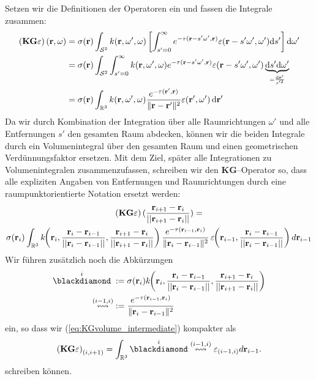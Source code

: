	Setzen wir die Definitionen der Operatoren ein und fassen die Integrale zusammen:
	\begin{align*}
		\left(\mathbf{KG}\varepsilon\right)(\mathbf{r},\omega)&=\sigma(\mathbf{r}) \int_{\mathcal{S}^2} k(\mathbf{r},\omega',\omega)\left[\int_{s'=0}^\infty e^{-\tau(\mathbf{r}-s' \omega',\mathbf{r})}\varepsilon(\mathbf{r}-s' \omega',\omega') \text{d}s'\right] \text{d}\omega' \\
		&=\sigma(\mathbf{r}) \int_{\mathcal{S}^2} \int_{s'=0}^\infty k(\mathbf{r},\omega',\omega) e^{-\tau(\mathbf{r}-s' \omega',\mathbf{r})}\varepsilon(\mathbf{r}-s' \omega',\omega') \underbrace{\text{d}s' \text{d}\omega'}_{=\frac{\text{d}\mathbf{r}'}{s'^2}} \\
		&=\sigma(\mathbf{r}) \int_{\mathbb{R}^3} k(\mathbf{r},\omega',\omega) \frac{e^{-\tau(\mathbf{r}',\mathbf{r})}}{\|\mathbf{r}-\mathbf{r}'\|^2}\varepsilon(\mathbf{r}',\omega') \,\text{d}\mathbf{r}'
	\end{align*}
	Da wir durch Kombination der Integration über alle Raumrichtungen $\omega'$ und alle Entfernungen $s'$ den gesamten Raum abdecken, können wir die beiden Integrale durch ein Volumenintegral über den gesamten Raum und einen geometrischen Verdünnungsfaktor ersetzen. Mit dem Ziel, später alle Integrationen zu Volumenintegralen zusammenzufassen, schreiben wir den $\mathbf{KG}$--Operator so, dass alle expliziten Angaben von Entfernungen und Raumrichtungen durch eine raumpunktorientierte Notation ersetzt werden:
	\begin{multline}
		\left(\mathbf{KG}\varepsilon\right)(\frac{\mathbf{r}_{i+1}-\mathbf{r}_i}{||\mathbf{r}_{i+1}-\mathbf{r}_i||})=\\
		\sigma(\mathbf{r}_i) \int_{\mathbb{R}^3} k\hspace{-1 mm}\left(\mathbf{r}_i,\frac{\mathbf{r}_i-\mathbf{r}_{i-1}}{||\mathbf{r}_i-\mathbf{r}_{i-1}||},\frac{\mathbf{r}_{i+1}-\mathbf{r}_i}{||\mathbf{r}_{i+1}-\mathbf{r}_i||}\right)\frac{e^{-\tau(\mathbf{r}_{i-1},\mathbf{r}_i)}}{\|\mathbf{r}_i-\mathbf{r}_{i-1}\|^2}\,\varepsilon\hspace{-1 mm}\left(\mathbf{r}_{i-1},\frac{\mathbf{r}_i-\mathbf{r}_{i-1}}{||\mathbf{r}_i-\mathbf{r}_{i-1}||}\right)d\mathbf{r}_{i-1}
		\label{eq:KGvolume_intermediate}
	\end{multline}
	Wir führen zusätzlich noch die Abkürzungen
	\begin{align*}
		\scatter{i}\;&:=\sigma(\location{r}_i)k\hspace{-1 mm}\left(\location{r}_i,\normalized{\location{r}_i-\location{r}_{i-1}},\normalized{\location{r}_{i+1}-\location{r}_i}\right)\\
		\propagate{i-1}{i}&:=\frac{e^{-\tau(\location{r}_{i-1},\location{r}_i)}}{\|\location{r}_i-\location{r}_{i-1}\|^2}
	\end{align*}
	ein, so dass wir (\ref{eq:KGvolume_intermediate}) %
	kompakter als
	\begin{equation}
		\left(\mathbf{KG}\varepsilon\right)_{(i,i+1)}=\int_{\mathbb{R}^3} \scatter{i}\propagate{i-1}{i}\varepsilon_{(i-1,i)}d\location{r}_{i-1}.
		\label{eq:KGvolume}
	\end{equation}
	schreiben können.


